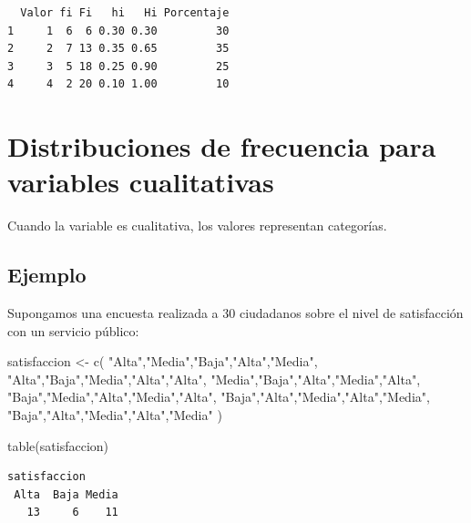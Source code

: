 \documentclass[
  spanish,
  14pt,
  letterpaper,
  DIV=11,
  numbers=noendperiod]{scrartcl}
\newenvironment{Shaded}{\begin{snugshade}}{\end{snugshade}}
\newcommand{\FunctionTok}[1]{\textcolor[rgb]{0.65,0.89,0.18}{#1}}
\newcommand{\NormalTok}[1]{\textcolor[rgb]{0.97,0.97,0.95}{#1}}
\newcommand{\OtherTok}[1]{\textcolor[rgb]{0.65,0.89,0.18}{#1}}
\newcommand{\StringTok}[1]{\textcolor[rgb]{0.90,0.86,0.45}{#1}}
\begin{document}
\begin{verbatim}
  Valor fi Fi   hi   Hi Porcentaje
1     1  6  6 0.30 0.30         30
2     2  7 13 0.35 0.65         35
3     3  5 18 0.25 0.90         25
4     4  2 20 0.10 1.00         10
\end{verbatim}

\section{Distribuciones de frecuencia para variables
cualitativas}\label{distribuciones-de-frecuencia-para-variables-cualitativas}

Cuando la variable es cualitativa, los valores representan categorías.

\subsection{Ejemplo}\label{ejemplo-1}

Supongamos una encuesta realizada a 30 ciudadanos sobre el nivel de
satisfacción con un servicio público:

\begin{Shaded}
\begin{Highlighting}[]
\NormalTok{satisfaccion }\OtherTok{\textless{}{-}} \FunctionTok{c}\NormalTok{(}
  \StringTok{"Alta"}\NormalTok{,}\StringTok{"Media"}\NormalTok{,}\StringTok{"Baja"}\NormalTok{,}\StringTok{"Alta"}\NormalTok{,}\StringTok{"Media"}\NormalTok{,}
  \StringTok{"Alta"}\NormalTok{,}\StringTok{"Baja"}\NormalTok{,}\StringTok{"Media"}\NormalTok{,}\StringTok{"Alta"}\NormalTok{,}\StringTok{"Alta"}\NormalTok{,}
  \StringTok{"Media"}\NormalTok{,}\StringTok{"Baja"}\NormalTok{,}\StringTok{"Alta"}\NormalTok{,}\StringTok{"Media"}\NormalTok{,}\StringTok{"Alta"}\NormalTok{,}
  \StringTok{"Baja"}\NormalTok{,}\StringTok{"Media"}\NormalTok{,}\StringTok{"Alta"}\NormalTok{,}\StringTok{"Media"}\NormalTok{,}\StringTok{"Alta"}\NormalTok{,}
  \StringTok{"Baja"}\NormalTok{,}\StringTok{"Alta"}\NormalTok{,}\StringTok{"Media"}\NormalTok{,}\StringTok{"Alta"}\NormalTok{,}\StringTok{"Media"}\NormalTok{,}
  \StringTok{"Baja"}\NormalTok{,}\StringTok{"Alta"}\NormalTok{,}\StringTok{"Media"}\NormalTok{,}\StringTok{"Alta"}\NormalTok{,}\StringTok{"Media"}
\NormalTok{)}

\FunctionTok{table}\NormalTok{(satisfaccion)}
\end{Highlighting}
\end{Shaded}

\begin{verbatim}
satisfaccion
 Alta  Baja Media 
   13     6    11 
\end{verbatim}
\end{document}
